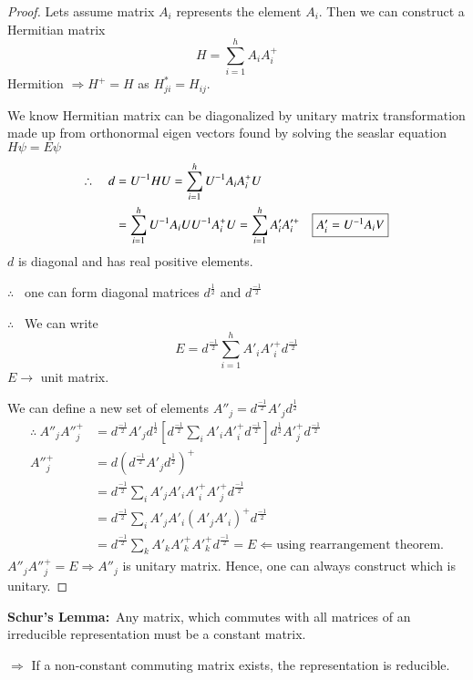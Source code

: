 \begin{proof}
Lets assume matrix $A_{i}$ represents the element $A_{i}$. Then we can construct a Hermitian matrix
$$
H=\sum\limits^{h}_{i=1}A_{i}A^{+}_{i}
$$
Hermition $\Rightarrow H^{+}=H$ as $H^{*}_{ji}=H_{ij}$.

We know Hermitian matrix can be diagonalized by unitary matrix transformation made up from orthonormal eigen vectors found by solving the seaslar equation $H\psi=E\psi$
\begin{align*}
\therefore\quad d &= U^{-1}HU=\sum\limits^{h}_{i=1}U^{-1}A_{i}A_{i}^{+}U\\
                  &= \sum\limits^{h}_{i=1}U^{-1}A_{i}UU^{-1}A_{i}^{+}U=\sum\limits^{h}_{i=1}A'_{i}A'^{+}_{i}\quad \fbox{$A'_{i}=U^{-1}A_{i}V$}
\end{align*}
$d$ is diagonal and has real positive elements.

$\therefore$ \ one can form diagonal matrices $d^{\frac{1}{2}}$ and $d^{\frac{-1}{2}}$ 

$\therefore$ \ We can write
$$
E=d^{\frac{-1}{2}}\sum\limits^{h}_{i=1}A'_{i}A'^{+}_{i}d^{\frac{-1}{2}}
$$
$E\to$ unit matrix.

We can define a new set of elements $A''_{j}=d^{\frac{-1}{2}}A'_{j}d^{\frac{1}{2}}$
\begin{align*}
\therefore~ A''_{j}A''^{+}_{j} &= d^{\frac{-1}{2}}A'_{j}d^{\frac{1}{2}}\left[d^{\frac{-1}{2}}\sum\limits_{i}A'_{i}A'^{+}_{i}d^{\frac{-1}{2}}\right]d^{\frac{1}{2}}A'^{+}_{j}d^{\frac{-1}{2}}\\
A''^{+}_{j} &= d\left(d^{\frac{-1}{2}}A'_{j}d^{\frac{1}{2}}\right)^{+}\\
&= d^{\frac{-1}{2}}\sum\limits_{i}A'_{j}A'_{i}A'^{+}_{i}A'^{+}_{j}d^{\frac{-1}{2}}\\
&= d^{\frac{-1}{2}}\sum\limits_{i}A'_{j}A'_{i}(A'_{j}A'_{i})^{+}d^{\frac{-1}{2}}\\
&= d^{\frac{-1}{2}}\sum\limits_{k}A'_{k}A'^{+}_{k}A'^{+}_{k}d^{\frac{-1}{2}}=E \Leftarrow \text{using rearrangement theorem.}
\end{align*}
$A''_{j}A''^{+}_{j}=E\Rightarrow A''_{j}$ is unitary matrix. Hence, one can always construct  which is unitary.
\end{proof}

\noindent
{\bf Schur's Lemma:}~Any matrix, which commutes with all matrices of an irreducible representation must be a constant matrix.

$\Rightarrow$ If a non-constant commuting matrix exists, the representation is reducible.

